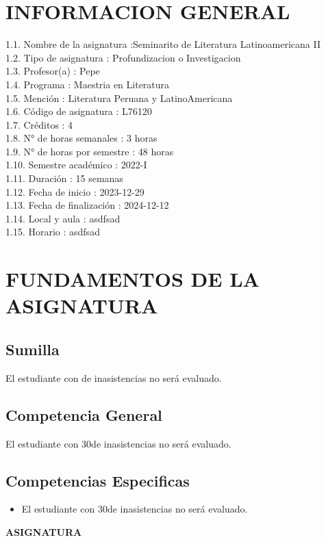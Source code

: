\documentclass[a4paper]{article}
\begin{document}
\section{INFORMACION GENERAL}
1.1. Nombre de la asignatura :Seminarito de Literatura Latinoamericana II \\ 
1.2. Tipo de asignatura : Profundizacion o Investigacion \\ 
1.3. Profesor(a) : Pepe  \\ 
1.4. Programa : Maestria en Literatura \\ 
1.5. Mención : Literatura Peruana y LatinoAmericana \\ 
1.6. Código de asignatura : L76120 \\ 
1.7. Créditos : 4  \\ 
1.8. N° de horas semanales : 3 horas \\ 
1.9. N° de horas por semestre : 48 horas \\ 
1.10. Semestre académico : 2022-I \\ 
1.11. Duración : 15 semanas \\ 
1.12. Fecha de inicio : 2023-12-29 \\ 
1.13. Fecha de finalización : 2024-12-12 \\ 
1.14. Local y aula : asdfsad \\ 
1.15. Horario : asdfsad \\ 
\section{FUNDAMENTOS DE LA ASIGNATURA}
\subsection{Sumilla}
El estudiante con  de inasistencias no será evaluado.
\subsection{Competencia General}
El estudiante con 30de inasistencias no será evaluado.
\subsection{Competencias Especificas}
\begin{itemize}
\item El estudiante con 30de inasistencias no será evaluado.
\end{itemize}
\newpage
\begin{flushleft}
{\huge \bf ASIGNATURA}\\[0.3cm]
\end{flushleft}
\end{document}
